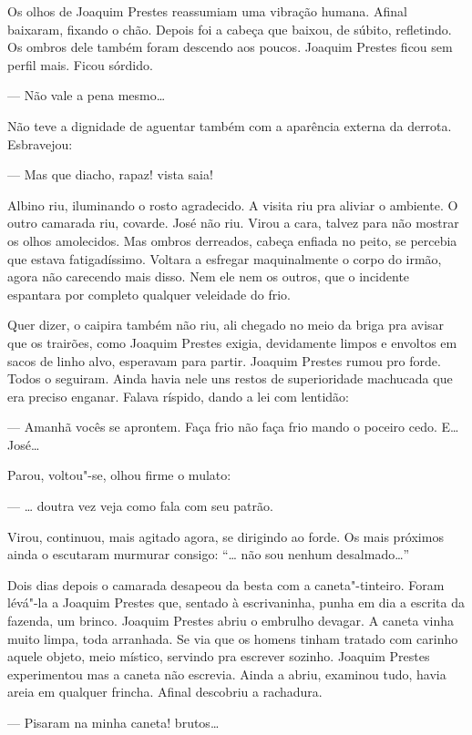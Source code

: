 Os olhos de Joaquim Prestes reassumiam uma vibração humana. Afinal
baixaram, fixando o chão. Depois foi a cabeça que baixou, de súbito,
refletindo. Os ombros dele também foram descendo aos poucos. Joaquim
Prestes ficou sem perfil mais. Ficou sórdido.

--- Não vale a pena mesmo\ldots{}

Não teve a dignidade de aguentar também com a aparência externa da
derrota. Esbravejou:

--- Mas que diacho, rapaz! vista saia!

Albino riu, iluminando o rosto agradecido. A visita riu pra aliviar o
ambiente. O outro camarada riu, covarde. José não riu. Virou a cara,
talvez para não mostrar os olhos amolecidos. Mas ombros derreados,
cabeça enfiada no peito, se percebia que estava fatigadíssimo. Voltara a
esfregar maquinalmente o corpo do irmão, agora não carecendo mais disso.
Nem ele nem os outros, que o incidente espantara por completo qualquer
veleidade do frio.

Quer dizer, o caipira também não riu, ali chegado no meio da briga pra
avisar que os trairões, como Joaquim Prestes exigia, devidamente limpos
e envoltos em sacos de linho alvo, esperavam para partir. Joaquim
Prestes rumou pro forde. Todos o seguiram. Ainda havia nele uns restos
de superioridade machucada que era preciso enganar. Falava ríspido,
dando a lei com lentidão:

--- Amanhã vocês se aprontem. Faça frio não faça frio mando o poceiro
cedo. E\ldots{} José\ldots{}

Parou, voltou"-se, olhou firme o mulato:

--- \ldots{} doutra vez veja como fala com seu patrão.

Virou, continuou, mais agitado agora, se dirigindo ao forde. Os mais
próximos ainda o escutaram murmurar consigo: ``\ldots{} não sou nenhum
desalmado\ldots{}''

Dois dias depois o camarada desapeou da besta com a caneta"-tinteiro.
Foram lévá"-la a Joaquim Prestes que, sentado à escrivaninha, punha em
dia a escrita da fazenda, um brinco. Joaquim Prestes abriu o embrulho
devagar. A caneta vinha muito limpa, toda arranhada. Se via que os
homens tinham tratado com carinho aquele objeto, meio místico, servindo
pra escrever sozinho. Joaquim Prestes experimentou mas a caneta não
escrevia. Ainda a abriu, examinou tudo, havia areia em qualquer frincha.
Afinal descobriu a rachadura.

--- Pisaram na minha caneta! brutos\ldots{}

